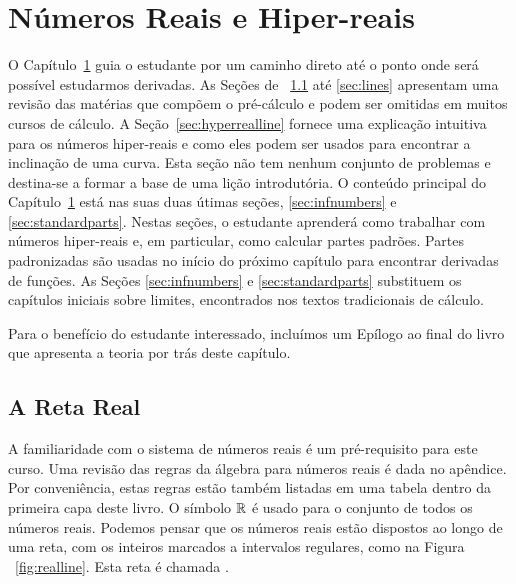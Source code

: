\documentclass{svmono}
\begin{document}
\mainmatter

\chapter{Números Reais e Hiper-reais}
\label{chp:reals}

O Capítulo~\ref{chp:reals} guia o estudante por um caminho direto até
o ponto onde será possível estudarmos derivadas. As Seções de%
~\ref{sec:realline} até \ref{sec:lines} apresentam uma revisão das
matérias que compõem o pré-cálculo e podem ser omitidas em muitos
cursos de cálculo. A Seção~\ref{sec:hyperrealline} fornece uma
explicação intuitiva para os números hiper-reais e como eles podem
ser usados para encontrar a inclinação de uma curva. Esta seção
não tem nenhum conjunto de problemas e destina-se a formar a base
de uma lição introdutória. O conteúdo principal do Capítulo~\ref{chp:reals}
está nas suas duas útimas seções, \ref{sec:infnumbers} e
\ref{sec:standardparts}. Nestas seções, o estudante aprenderá como
trabalhar com números hiper-reais e, em particular, como calcular
partes padrões. Partes padronizadas são usadas no início do próximo
capítulo para encontrar derivadas de funções. As Seções \ref{sec:infnumbers} e 
\ref{sec:standardparts} substituem os capítulos iniciais sobre limites,
encontrados nos textos tradicionais de cálculo.

Para o benefício do estudante interessado, incluímos um Epílogo ao final
do livro que apresenta a teoria por trás deste capítulo.

\section{A Reta Real}
\label{sec:realline}

A familiaridade com o sistema de números reais é um pré-requisito
para este curso. Uma revisão das regras da álgebra para números reais
é dada no apêndice. Por conveniência, estas regras estão também listadas
em uma tabela dentro da primeira capa deste livro. O símbolo
$\mathbb{R}$ é usado para o conjunto de todos os números reais.
Podemos pensar que os números reais estão dispostos ao longo de uma
reta, com os inteiros marcados a intervalos regulares, como na Figura%
~\ref{fig:realline}. Esta reta é chamada .

\end{document}
